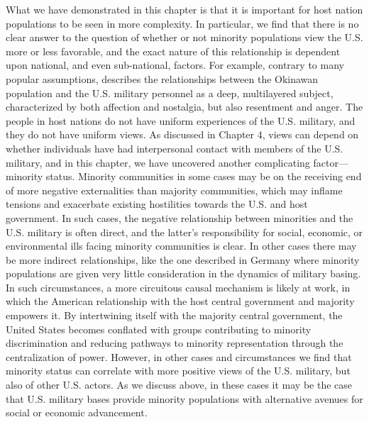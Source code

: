 What we have demonstrated in this chapter is that it is important for host nation populations to be seen in more complexity. In particular, we find that there is no clear answer to the question of whether or not minority populations view the U.S. more or less favorable, and the exact nature of this relationship is dependent upon national, and even sub-national, factors. For example, contrary to many popular assumptions,  describes the relationships between the Okinawan population and the U.S. military personnel as a deep, multilayered subject, characterized by both affection and nostalgia, but also resentment and anger. The people in host nations do not have uniform experiences of the U.S. military, and they do not have uniform views. As discussed in Chapter 4, views can depend on whether individuals have had interpersonal contact with members of the U.S. military, and in this chapter, we have uncovered another complicating factor---minority status. Minority communities in some cases may be on the receiving end of more negative externalities than majority communities, which may inflame tensions and exacerbate existing hostilities towards the U.S. and host government. In such cases, the negative relationship between minorities and the U.S. military is often direct, and the latter's responsibility for social, economic, or environmental ills facing minority communities is clear. In other cases there may be more indirect relationships, like the one described in Germany where minority populations are given very little consideration in the dynamics of military basing. In such circumstances, a more circuitous causal mechanism is likely at work, in which the American relationship with the host central government and majority empowers it. By intertwining itself with the majority central government, the United States becomes conflated with groups contributing to minority discrimination and reducing pathways to minority representation through the centralization of power. However, in other cases and circumstances we find that minority status can correlate with more positive views of the U.S. military, but also of other U.S. actors. As we discuss above, in these cases it may be the case that U.S. military bases provide minority populations with alternative avenues for social or economic advancement. 



